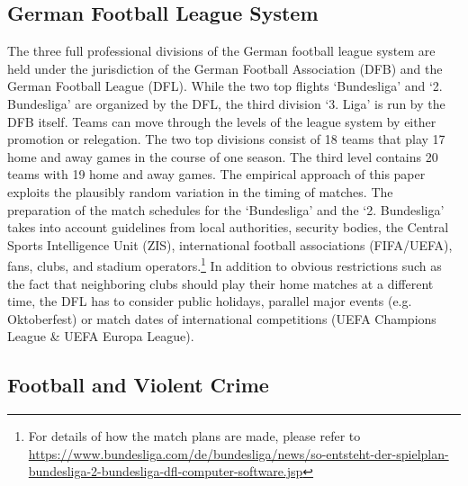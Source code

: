 \subsection{German Football League System}
The three full professional divisions of the German football league system are held under the jurisdiction of the German Football Association (DFB) and the German Football League (DFL). While the two top flights `Bundesliga' and `2. Bundesliga' are organized by the DFL, the third division `3. Liga' is run by the DFB itself. Teams can move through the levels of the league system by either promotion or relegation. The two top divisions consist of 18 teams that play 17 home and away games in the course of one season. The third level contains 20 teams with 19 home and away games. The empirical approach of this paper exploits the plausibly random variation in the timing of matches. The preparation of the match schedules for the `Bundesliga' and the `2. Bundesliga' takes into account guidelines from local authorities, security bodies, the Central Sports Intelligence Unit (ZIS), international football associations (FIFA/UEFA), fans, clubs, and stadium operators.\footnote{For details of how the match plans are made, please refer to \href{https://www.bundesliga.com/de/bundesliga/news/so-entsteht-der-spielplan-bundesliga-2-bundesliga-dfl-computer-software.jsp}{https://www.bundesliga.com/de/bundesliga/news/so-entsteht-der-spielplan-bundesliga-2-bundesliga-dfl-computer-software.jsp}} In addition to obvious restrictions such as the fact that neighboring clubs should play their home matches at a different time, the DFL has to consider public holidays, parallel major events (e.g. Oktoberfest) or match dates of international competitions (UEFA Champions League \& UEFA Europa League).



\subsection{Football and Violent Crime}

